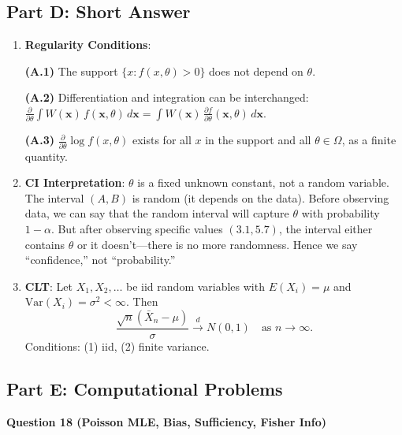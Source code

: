 \documentclass[11pt]{article}
\begin{document}
\subsection*{Part D: Short Answer}

\begin{enumerate}[start=15]
\item \textbf{Regularity Conditions}:

\textbf{(A.1)} The support $\{x : f(x,\theta) > 0\}$ does not depend on $\theta$.

\textbf{(A.2)} Differentiation and integration can be interchanged:
$\frac{\partial}{\partial\theta}\int W(\mathbf{x})\,f(\mathbf{x},\theta)\,d\mathbf{x} = \int W(\mathbf{x})\,\frac{\partial f}{\partial\theta}(\mathbf{x},\theta)\,d\mathbf{x}$.

\textbf{(A.3)} $\frac{\partial}{\partial\theta}\log f(x,\theta)$ exists for all $x$ in the support and all $\theta \in \Omega$, as a finite quantity.

\item \textbf{CI Interpretation}: $\theta$ is a fixed unknown constant, not a random variable. The interval $(A,B)$ is random (it depends on the data). Before observing data, we can say that the random interval will capture $\theta$ with probability $1-\alpha$. But after observing specific values $(3.1, 5.7)$, the interval either contains $\theta$ or it doesn't---there is no more randomness. Hence we say ``confidence,'' not ``probability.''

\item \textbf{CLT}: Let $X_1, X_2, \ldots$ be iid random variables with $E(X_i) = \mu$ and $\text{Var}(X_i) = \sigma^2 < \infty$. Then
$$\frac{\sqrt{n}(\bar X_n - \mu)}{\sigma} \xrightarrow{d} N(0,1) \quad \text{as } n \to \infty.$$
Conditions: (1) iid, (2) finite variance.
\end{enumerate}

\subsection*{Part E: Computational Problems}

\textbf{Question 18 (Poisson MLE, Bias, Sufficiency, Fisher Info)}
\end{document}
